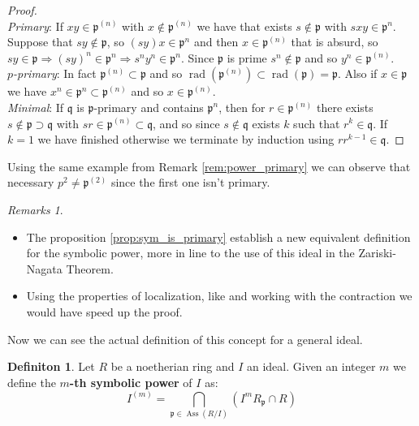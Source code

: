 \documentclass[notitlepage, a4]{book}
\theoremstyle{plain}
\theoremstyle{remark}
\newtheorem{rems}[rem]{Remarks}
\theoremstyle{definition}
\newtheorem{deff}[teo]{Definiton}
\newcommand{\p}{\mathfrak{p}}
\newcommand{\q}{\mathfrak{q}}
\DeclareMathOperator{\rad}{rad}
\DeclareMathOperator{\Ass}{Ass}
\begin{document}
	\begin{proof}\quad \\
		\textit{Primary}: If $ xy \in  \p^{(n)}$ with $ x \not \in  \p^{(n)}$ we have that exists $ s \not \in \p $ with $ sxy \in \p^n $. Suppose that $ sy \not \in \p $, so $ (sy)x \in \p^n $ and then $ x \in \p^{(n)} $ that is absurd, so $ sy \in \p \Rightarrow (sy)^n \in \p^n \Rightarrow s^n y^n \in \p^n$. Since $ \p $ is prime $ s^n \not \in \p $ and so $ y^n \in \p^{(n)} $. \\
		\textit{$p$-primary}: In fact $ \p^{(n)} \subset \p $ and so $  \rad  (\p^{(n)} )\subset \rad (\p) = \p$. Also if $ x \in \p $ we have $ x^n \in \p^n \subset \p^{(n)}  $ and so $ x \in \p^{(n)}  $.\\
		\textit{Minimal}: If $ \q $ is $ \p $-primary and contains $ \p^n $, then for $ r \in \p^{(n)}  $ there exists $ s \not \in \p \supset \q $ with $ sr \in \p^{(n)}  \subset \q $, and so since $ s \not \in \q  $ exists $ k $ such that $ r^k \in \q $. If $ k=1 $ we have finished otherwise we terminate by induction using $ r r^{k-1} \in \q $.
	\end{proof}
	Using the same example from Remark \ref{rem:power_primary} we can observe that necessary $ p^2 \neq \p^{(2)}  $ since the first one isn't primary. 
	
	\begin{rems}
		\begin{itemize}
		\item The proposition \ref{prop:sym_is_primary} establish a new equivalent definition for the symbolic power, more in line to the use of this ideal in the Zariski-Nagata Theorem.
		\item Using the properties of localization, like \cite[Proposition 4.8]{AMCD} and working with the contraction we would have speed up the proof.
		\end{itemize}
	\end{rems}
	
Now we can see the actual definition of this concept for a general ideal.

\begin{deff}
	Let $ R $ be a noetherian ring and $ I $ an ideal. Given an integer $ m $ we define the \textbf{$ m $-th symbolic power} of $ I $ as:
	\begin{equation}\label{eq:sym_pow_def}
		I^{(m)} = \bigcap_{\p \in \Ass(R/I) } (I^m R_\p \cap R)
	\end{equation}
\end{deff}
\end{document}
